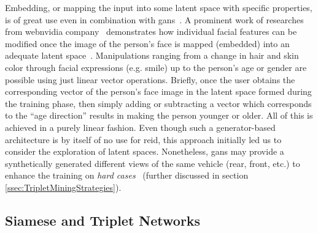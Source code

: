 Embedding, or mapping the input into some latent space with specific properties, is of great use even in combination with \glspl{gan}~\cite{goodfellow2014gans}. A prominent work of researches from webnvidia company~\cite{webnvidia} demonstrates how individual facial features can be modified once the image of the person's face is mapped (embedded) into an adequate latent space~\cite{karras2020stylegan}. Manipulations ranging from a change in hair and skin color through facial expressions (e.g. smile) up to the person's age or gender are possible using just linear vector operations. Briefly, once the user obtains the corresponding vector of the person's face image in the latent space formed during the training phase, then simply adding or subtracting a vector which corresponds to the ``age direction'' results in making the person younger or older. All of this is achieved in a purely linear fashion. Even though such a generator-based architecture is by itself of no use for \gls{reid}, this approach initially led us to consider the exploration of latent spaces. Nonetheless, \glspl{gan} may provide a synthetically generated different views of the same vehicle (rear, front, etc.) to enhance the training on \emph{hard cases}~\cite{lou2019embreid} (further discussed in section \ref{ssec:TripletMiningStrategies}).

\subsection{Siamese and Triplet Networks}
\label{ssec:SiameseAndTripletNetworks}


